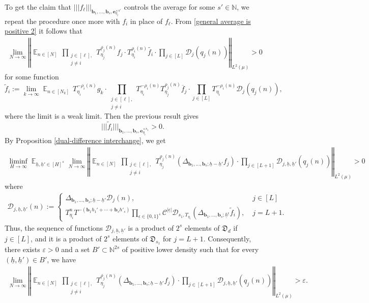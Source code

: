 \documentclass[11pt]{amsart}
\theoremstyle{definition}
\newcommand{\N}{{\mathbb N}}
\newcommand{\CC}{{\mathcal C}}
\newcommand{\CD}{{\mathcal D}}
\newcommand{\FD}{{\mathfrak D}}
\newcommand{\be}{{\mathbf{e}}}
\renewcommand{\b}{{\textbf{b}}}
\newcommand{\uh}{{\underline{h}}}
\newcommand{\veps}{\varepsilon}
\newcommand{\ueps}{{\underline{\epsilon}}}
\newcommand{\norm}[1]{\left\Vert #1\right\Vert}
\newcommand{\nnorm}[1]{\lvert\!|\!| #1|\!|\!\rvert}
\DeclareMathOperator*{\E}{\mathbb{E}}
\begin{document}
To get the claim that $\nnorm{f_\ell}_{{\b_1}, \ldots, {\b_s}, \be_{\eta_\ell}^{\times s'}}$ controls the average for some $s'\in\N$, we repeat the procedure once more with $f_i$ in place of $f_\ell$. From \eqref{general average is positive 2} it follows that
\begin{align*}
\lim_{N\to\infty}\norm{\E_{n\in [N]} \,\prod_{\substack{j\in[\ell],\\ j\neq i}}T_{{\eta_j}}^{\rho_j(n)}f_j \cdot T_{\eta_i}^{\rho_i(n)}\tilde{f_i} \cdot \prod_{j\in[L]}\CD_{j}(q_j(n))}_{L^2(\mu)}>0
\end{align*}
for some function
	\begin{equation*}
	\tilde{f}_i:=\lim_{k\to\infty} \E_{n\in [N_k]}
	 \, T_{\eta_i}^{-\rho_i(n)}g_k\cdot \prod_{\substack{j\in [\ell],\\ j\neq i}}T_{\eta_i}^{-\rho_i(n)} T_{{\eta_j}}^{\rho_j(n)}\overline{f}_j\cdot \prod_{j\in[L]}T_{\eta_i}^{-\rho_i(n)}\CD_{j}(q_j(n)),
	\end{equation*}
where the limit is a weak limit. Then the previous result gives
$$
\nnorm{\tilde{f}_i}_{{\b_1}, \ldots, {\b_s}, \be_{\eta_i}^{\times s_1}}>0.
$$
By Proposition \ref{dual-difference interchange}, we get
\begin{align*}
    \liminf_{H\to\infty}\E_{\uh,\uh'\in [H]^{s}}\lim_{N\to\infty}\norm{\E_{n\in[N]} \, \prod_{\substack{j\in[\ell],\\ j\neq i}} T_{{\eta_j}}^{\rho_j(n)} (\Delta_{{\b_1}, \ldots, {\b_{s}}; \uh-\uh'} f_j)\cdot \prod_{j\in[L+1]}\CD_{j,\uh,\uh'}(q_j(n))}_{L^2(\mu)}>0
\end{align*}
where
\begin{align*}
    \CD_{j,\uh,\uh'}(n):=\begin{cases} \Delta_{{\b_1}, \ldots, {\b_s}; \uh-\uh'}\CD_{j}(n),\; &j \in[L]\\
    T_{\eta_i}^n T^{-(\b_1 h_1'+\cdots+\b_s h'_s)}\prod\limits_{\ueps\in\{0,1\}^s}\CC^{|\ueps|}\CD_{s_1, T_{\eta_i}}(\Delta_{{\b_1}, \ldots, {\b_{s}}; \uh^{\ueps}}\tilde{f}_i),\; &j=L+1.
    \end{cases}
\end{align*}
Thus, the sequence of functions $\CD_{j,\uh,\uh'}$ is a product of $2^s$ elements of $\FD_d$ if $j\in[L]$, and it is a product of $2^{s}$ elements of $\FD_{s_1}$ for $j=L+1$. Consequently, there exists $\veps>0$ and a set $B'\subset\N^{2s}$ of positive lower density such that for every $(\uh, \uh')\in B'$, we have
\begin{align*}%
    \lim_{N\to\infty}\norm{\E_{n\in[N]} \, \prod_{\substack{j\in[\ell],\\ j\neq i}} T_{{\eta_j}}^{\rho_j(n)} (\Delta_{{\b_1}, \ldots, {\b_{s}}; \uh-\uh'} f_j)\cdot \prod_{j\in[L+1]}\CD_{j,\uh,\uh'}(q_j(n))}_{L^2(\mu)} > \veps.
\end{align*}
\end{document}
